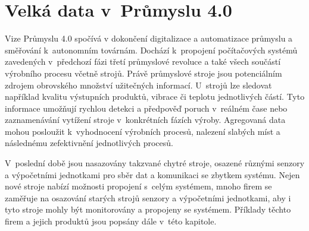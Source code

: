 \chapter{Velká data v~Průmyslu 4.0}\label{kap:industry4.0}
Vize Průmyslu 4.0 spočívá v dokončení digitalizace a automatizace průmyslu a směřování k~autonomním továrnám. Dochází k~propojení počítačových systémů zavedených v~předchozí fázi třetí průmyslové revoluce a také všech součástí výrobního procesu včetně strojů. Právě průmyslové stroje jsou potenciálním zdrojem obrovského množství užitečných informací. U~strojů lze sledovat například kvalitu výstupních produktů, vibrace či teplotu jednotlivých částí. Tyto informace umožňují rychlou detekci a předpověď poruch v~reálném čase nebo zaznamenávání vytížení stroje v~konkrétních fázích výroby. Agregovaná data mohou posloužit k~vyhodnocení výrobních procesů, nalezení slabých míst a následnému zefektivnění jednotlivých procesů. 

V~poslední době jsou nasazovány takzvané chytré stroje, osazené různými senzory a výpočetními jednotkami pro sběr dat a komunikaci se zbytkem systému. Nejen nové stroje nabízí možnosti propojení s~celým systémem, mnoho firem se zaměřuje na osazování starých strojů senzory a výpočetními jednotkami, aby i tyto stroje mohly být monitorovány a propojeny se systémem. Příklady těchto firem a jejich produktů jsou popsány dále v~této kapitole.




